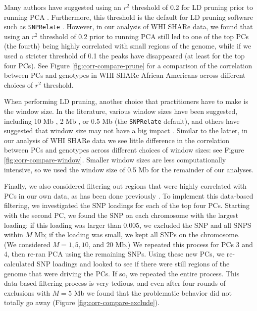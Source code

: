 \documentclass[12pt]{article}
\begin{document}
Many authors have suggested using an $r^2$ threshold of 0.2 for LD pruning prior to running PCA \citep{prive2018, weale2010, galinsky2016, zou2010, fellay2007, reed2015, novembre2008, anderson2010}.
Furthermore, this threshold is the default for LD pruning software such as \texttt{SNPRelate} \citep{snprelate}.
However, in our analysis of WHI SHARe data, we found that using an $r^2$ threshold of 0.2 prior to running PCA still led to one of the top PCs (the fourth) being highly correlated with small regions of the genome, while if we used a stricter threshold of 0.1 the peaks have disappeared (at least for the top four PCs).
See Figure \ref{fig:corr-compare-prune} for a comparison of the correlation between PCs and genotypes in WHI SHARe African Americans across different choices of $r^2$ threshold.

When performing LD pruning, another choice that practitioners have to make is the window size. 
In the literature, various window sizes have been suggested, including 10 Mb \citep{conomos2016}, 2 Mb \citep{weale2010}, or 0.5 Mb (the \texttt{SNPRelate} default), and others have suggested that window size may not have a big impact \citep{zou2010}.
Similar to the latter, in our analysis of WHI SHARe data we see little difference in the correlation between PCs and genotypes across different choices of window sizes: see Figure \ref{fig:corr-compare-window}.
Smaller window sizes are less computationally intensive, so we used the window size of 0.5 Mb for the remainder of our analyses.

Finally, we also considered filtering out regions that were highly correlated with PCs in our own data, as has been done previously \citep{novembre2008, prive2018}.
To implement this data-based filtering, we investigated the SNP loadings for each of the top four PCs. 
Starting with the second PC, we found the SNP on each chromosome with the largest loading: if this loading was larger than 0.005, we excluded the SNP and all SNPS within $M$ Mb; if the loading was small, we kept all SNPs on the chromosome.
(We considered $M = 1, 5, 10$, and $20$ Mb.) 
We repeated this process for PCs 3 and 4, then re-ran PCA using the remaining SNPs.
Using these new PCs, we re-calculated SNP loadings and looked to see if there were still regions of the genome that were driving the PCs.
If so, we repeated the entire process.
This data-based filtering process is very tedious, and even after four rounds of exclusions with $M = 5$ Mb we found that the problematic behavior did not totally go away (Figure \ref{fig:corr-compare-exclude}).
\end{document}
